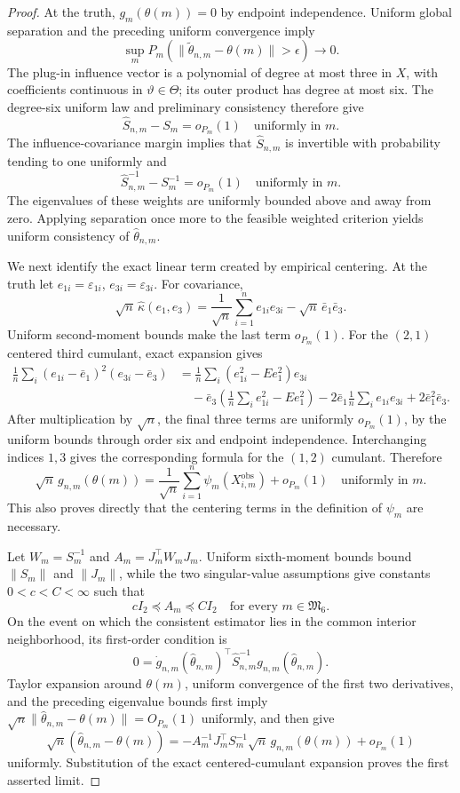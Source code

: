 \documentclass{article}
\begin{document}
\begin{proof}
At the truth, \(g_m(\theta(m))=0\) by endpoint independence. Uniform global separation and the preceding uniform convergence imply
\[
\sup_mP_m(\|\widetilde\theta_{n,m}-\theta(m)\|>\epsilon)\to0.
\]
The plug-in influence vector is a polynomial of degree at most three in \(X\), with coefficients continuous in \(\vartheta\in\Theta\); its outer product has degree at most six. The degree-six uniform law and preliminary consistency therefore give
\[
\widehat S_{n,m}-S_m=o_{P_m}(1)
\quad\text{uniformly in }m.
\]
The influence-covariance margin implies that \(\widehat S_{n,m}\) is invertible with probability tending to one uniformly and
\[
\widehat S_{n,m}^{-1}-S_m^{-1}=o_{P_m}(1)
\quad\text{uniformly in }m.
\]
The eigenvalues of these weights are uniformly bounded above and away from zero. Applying separation once more to the feasible weighted criterion yields uniform consistency of \(\widehat\theta_{n,m}\).

We next identify the exact linear term created by empirical centering. At the truth let \(e_{1i}=\varepsilon_{1i}\), \(e_{3i}=\varepsilon_{3i}\). For covariance,
\[
\sqrt n\,\widehat\kappa(e_1,e_3)
=\frac1{\sqrt n}\sum_{i=1}^ne_{1i}e_{3i}
-\sqrt n\,\bar e_1\bar e_3.
\]
Uniform second-moment bounds make the last term \(o_{P_m}(1)\). For the \((2,1)\) centered third cumulant, exact expansion gives
\[
\begin{aligned}
\frac1n\sum_i(e_{1i}-\bar e_1)^2(e_{3i}-\bar e_3)
&=\frac1n\sum_i(e_{1i}^2-Ee_1^2)e_{3i}\\
&\quad-\bar e_3\left(\frac1n\sum_ie_{1i}^2-Ee_1^2\right)
-2\bar e_1\frac1n\sum_ie_{1i}e_{3i}
+2\bar e_1^2\bar e_3.
\end{aligned}
\]
After multiplication by \(\sqrt n\), the final three terms are uniformly \(o_{P_m}(1)\), by the uniform bounds through order six and endpoint independence. Interchanging indices \(1,3\) gives the corresponding formula for the \((1,2)\) cumulant. Therefore
\[
\sqrt n\,g_{n,m}(\theta(m))
=\frac1{\sqrt n}\sum_{i=1}^n\psi_m(X_{i,m}^{\mathrm{obs}})+o_{P_m}(1)
\quad\text{uniformly in }m.
\]
This also proves directly that the centering terms in the definition of \(\psi_m\) are necessary.

Let \(W_m=S_m^{-1}\) and \(A_m=J_m^\top W_mJ_m\). Uniform sixth-moment bounds bound \(\|S_m\|\) and \(\|J_m\|\), while the two singular-value assumptions give constants \(0<c<C<\infty\) such that
\[
cI_2\preceq A_m\preceq CI_2
\quad\text{for every }m\in\mathfrak M_6.
\]
On the event on which the consistent estimator lies in the common interior neighborhood, its first-order condition is
\[
0=\dot g_{n,m}(\widehat\theta_{n,m})^\top
\widehat S_{n,m}^{-1}g_{n,m}(\widehat\theta_{n,m}).
\]
Taylor expansion around \(\theta(m)\), uniform convergence of the first two derivatives, and the preceding eigenvalue bounds first imply
\(\sqrt n\|\widehat\theta_{n,m}-\theta(m)\|=O_{P_m}(1)\) uniformly, and then give
\[
\sqrt n(\widehat\theta_{n,m}-\theta(m))
=-A_m^{-1}J_m^\top S_m^{-1}\sqrt n\,g_{n,m}(\theta(m))+o_{P_m}(1)
\]
uniformly. Substitution of the exact centered-cumulant expansion proves the first asserted limit.


\end{proof}
\end{document}

